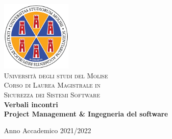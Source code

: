 
\begin{titlepage}
 \begin{center}
     \includegraphics[width=3.5cm]{../0_frontespizio/imgs/unimol/unimol_color.png}\\
     \vspace{2em}
     {\Large \textsc{Università  degli studi del Molise}}\\
     \vspace{1em}
     {\Large \textsc{Corso di Laurea Magistrale in}}\\
     \vspace{1em}
      {\Large \textsc{Sicurezza dei Sistemi Software }}\\
     \vspace{2em}
     \vspace{4em}
     {\LARGE\textbf{
     Verbali incontri\\
       \vspace{2em}
    Project Management \& Ingegneria del software
     }}\\
 \end{center}

\begin{center}
\vspace{\fill} %
{\normalsize Anno Accademico 2021/2022}
\end{center}
\end{titlepage}

\clearpage{\pagestyle{empty}\cleardoublepage}
